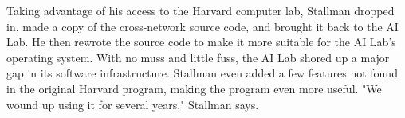 \ifdefined\eng
Taking advantage of his access to the Harvard computer lab, Stallman dropped in, made a copy of the cross-network source code, and brought it back to the AI Lab. He then rewrote the source code to make it more suitable for the AI Lab's operating system. With no muss and little fuss, the AI Lab shored up a major gap in its software infrastructure. Stallman even added a few features not found in the original Harvard program, making the program even more useful. "We wound up using it for several years," Stallman says.
\fi






